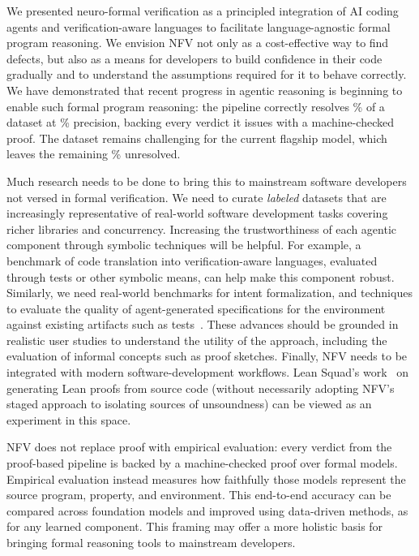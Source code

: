\documentclass[11pt,letterpaper]{article}
\begin{document}
We presented neuro-formal verification as a principled integration of AI coding agents 
and verification-aware languages to facilitate language-agnostic formal program reasoning.
We envision NFV not only as a cost-effective way to find defects, but also as
a means for developers to build confidence in their code gradually and to
understand the assumptions required for it to behave correctly.
We have demonstrated that recent progress in agentic reasoning is beginning to
enable such formal program reasoning:
the pipeline correctly resolves \anpiperec{}\% of a dataset at
\anpipeprec{}\% precision, backing every verdict it issues with a
machine-checked proof.
The dataset remains challenging for the current flagship model, which leaves the remaining
\anpipeopen{}\% unresolved.


Much research needs to be done to bring this to mainstream software developers not versed in formal 
verification.
We need to curate \emph{labeled} datasets that are increasingly representative of real-world 
software development tasks covering richer libraries and concurrency.
Increasing the trustworthiness of each agentic component through symbolic techniques
will be helpful.
For example, a benchmark of code translation into 
verification-aware languages, evaluated through tests or other symbolic means, can help make this 
component robust.
Similarly, we need real-world benchmarks for intent formalization, and techniques to
evaluate the quality of agent-generated specifications for the environment against
existing artifacts such as tests~\cite{lahiri2026intent,lahiri2024symbolic}.
These advances should be grounded in realistic user studies to understand the utility of the approach,
including the evaluation of informal concepts such as proof sketches.
Finally, NFV needs to be integrated with modern software-development workflows.
Lean Squad's work~\cite{syme2026leansquad} on generating Lean
proofs from source code (without necessarily adopting NFV's staged approach to
isolating sources of unsoundness) can be viewed as an experiment in this space.

NFV does not replace proof with empirical evaluation: every verdict from the
proof-based pipeline is backed by a machine-checked proof over formal models.
Empirical evaluation instead measures how faithfully those models represent
the source program, property, and environment. This end-to-end accuracy can be
compared across foundation models and improved using data-driven methods, as
for any learned component. This framing may offer a more holistic basis for
bringing formal reasoning tools to mainstream developers.
\end{document}
